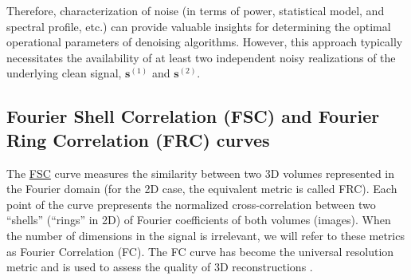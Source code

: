 \documentclass{article}
\begin{document}
Therefore, characterization of noise (in terms of power, statistical
model, and spectral profile, etc.) can provide valuable insights for
determining the optimal operational parameters of denoising
algorithms. However, this approach typically necessitates the
availability of at least two independent noisy realizations of the
underlying clean signal, $\mathbf{s}^{(1)}$ and
$\mathbf{s}^{(2)}$.

\subsection{Fourier Shell Correlation (FSC) and Fourier Ring
  Correlation (FRC) curves}
\label{sec:fourier_correlation}

The
\href{https://en.wikipedia.org/wiki/Fourier_shell_correlation}{FSC}
curve measures the similarity between two 3D volumes represented in
the Fourier domain \cite{verbeke2024self} (for the 2D case, the
equivalent metric is called FRC). Each point of the curve prepresents
the normalized cross-correlation between two ``shells'' (``rings'' in
2D) of Fourier coefficients of both volumes (images). When the number
of dimensions in the signal is irrelevant, we will refer to these
metrics as Fourier Correlation (FC). The FC curve has become the
universal resolution metric and is used to assess the quality of 3D
reconstructions \cite{rosenthal2003optimal,scheres2012prevention}.
\end{document}
